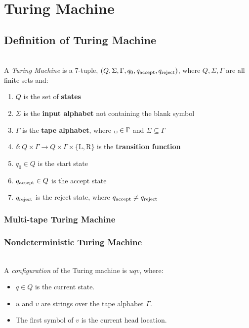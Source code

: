 \setcounter{chapter}{1}
\chapter{Turing Machine}

\setcounter{section}{0}

\section{Definition of Turing Machine} \label{sec:}

\begin{definition}~
\\A \textit{Turing Machine} is a 7-tuple, $(Q,\Sigma,\Gamma,q_0,q_{\text{accept} },q_{\text{reject} })$, where $Q,\Sigma,\Gamma$ are all finite sets and:
\begin{enumerate}
    \item $Q$ is the set of \textbf{states}
    \item $\Sigma$ is the \textbf{input alphabet} not containing the blank symbol \texttt{}
    \item $\Gamma$ is the \textbf{tape alphabet}, where $ \texttt{\char32} \in \Gamma$ and $\Sigma \subseteq \Gamma$
    \item $\delta: Q \times \Gamma \to Q\times \Gamma \times \{ \text{L}, \text{R}\}$ is the \textbf{transition function}
    \item $q_0 \in Q$ is the start state
    \item $q_{\text{accept} } \in Q$ is the accept state
    \item $q_{\text{reject} }$ is the reject state, where $q_{\text{accept} } \neq q_{\text{reject} }$
\end{enumerate}
\end{definition}

\subsection{Multi-tape Turing Machine} \label{sec:}


\subsection{Nondeterministic Turing Machine} \label{sec:}



\begin{definition}[Configuration] ~
\\A \textit{configuration} of the Turing machine is $u q v$, where:
\begin{itemize}
    \item $q \in Q$ is the current state.
    \item $u$ and $v$ are strings over the tape alphabet $\Gamma$.
    \item The first symbol of $v$ is the current head location.
\end{itemize}
\end{definition}

